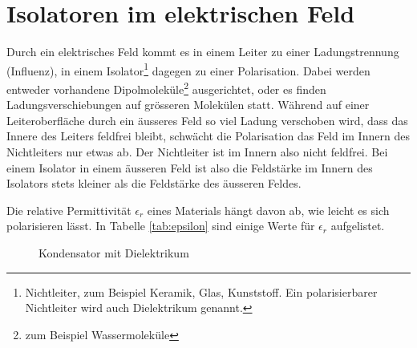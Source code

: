 \documentclass[11pt,twoside=false,open=any]{scrbook}
\begin{document}
\section{Isolatoren im elektrischen Feld}
Durch ein elektrisches Feld kommt es in einem Leiter zu einer Ladungstrennung (Influenz), in einem Isolator\footnote{Nichtleiter, zum Beispiel Keramik, Glas, Kunststoff. Ein polarisierbarer Nichtleiter wird auch Dielektrikum genannt.} dagegen zu einer Polarisation. Dabei werden entweder vorhandene Dipolmoleküle\footnote{zum Beispiel Wassermoleküle} ausgerichtet, oder es finden Ladungsverschiebungen auf grösseren Molekülen statt. Während auf einer Leiteroberfläche durch ein äusseres Feld so viel Ladung verschoben wird, dass das Innere des Leiters feldfrei bleibt, schwächt die Polarisation das Feld im Innern des Nichtleiters nur etwas ab. Der Nichtleiter ist im Innern also nicht feldfrei. Bei einem Isolator in einem äusseren Feld ist also die Feldstärke im Innern des Isolators stets kleiner als die Feldstärke des äusseren Feldes. 

\begin{center}
   \setlength{\fboxrule}{2pt}
\end{center}
Die relative Permittivität $\epsilon_{r}$ eines Materials hängt davon ab, wie leicht es sich polarisieren lässt. In Tabelle \ref{tab:epsilon} sind einige Werte für $\epsilon_{r}$ aufgelistet.


\begin{figure}[h]
\begin{center}

\caption{Kondensator mit Dielektrikum}
\label{fig:kondensator}
\end{center}
\end{figure}
\end{document}
